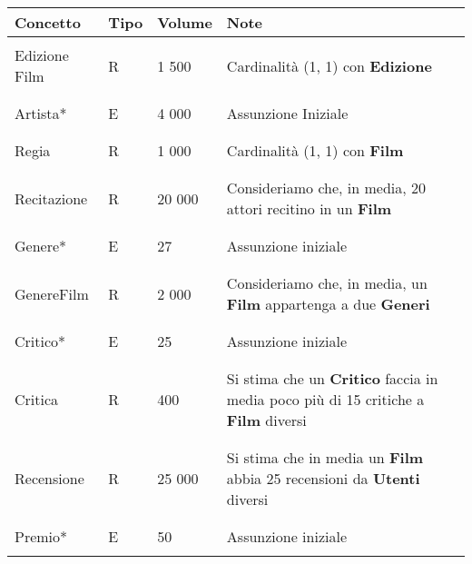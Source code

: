 \documentclass{article}
\begin{document}
%
%
%
%
%
%
%
%
\begin{tabular}{|C{2.3cm}|C{0.7cm}|C{1.7cm}|C{6.2cm}|}
\hline
    \textbf{Concetto} & \textbf{Tipo} & \textbf{Volume} & \textbf{Note} \\
\hline
\hline
& & & \\    
    Edizione Film & R & 1 500 & Cardinalità (1, 1) con \textbf{Edizione} \\
& & & \\
\hline
& & & \\    
    Artista* & E & 4 000 & Assunzione Iniziale \\
& & & \\
\hline
& & & \\    
    Regia & R & 1 000 & Cardinalità (1, 1) con \textbf{Film} \\
& & & \\
\hline
& & & \\    
    Recitazione & R & 20 000 &  Consideriamo che, in media, 20 attori recitino in un \textbf{Film} \\
& & & \\
\hline
& & & \\    
    Genere* & E & 27 & Assunzione iniziale \\
& & & \\
\hline
& & & \\    
    GenereFilm & R & 2 000 & Consideriamo che, in media, un \textbf{Film} appartenga a due \textbf{Generi} \\
& & & \\
\hline
& & & \\     
    Critico* & E & 25 & Assunzione iniziale \\
& & & \\
\hline
& & & \\    
    Critica & R & 400 & Si stima che un \textbf{Critico} faccia in media poco più di 15 critiche a \textbf{Film} diversi \\
& & & \\
\hline
& & & \\    
    Recensione & R & 25 000 & Si stima che in media un \textbf{Film} abbia 25 recensioni da \textbf{Utenti} diversi \\
& & & \\
\hline
& & & \\    
    Premio* & E & 50 & Assunzione iniziale \\
& & & \\
\hline 
\end{tabular}
\end{document}
